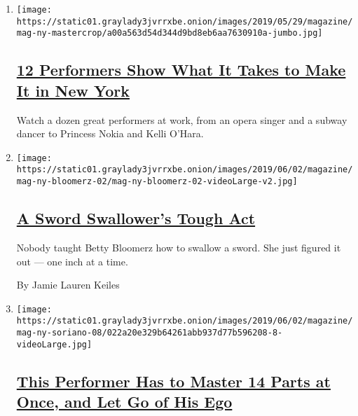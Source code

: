 \begin{enumerate}
\def\labelenumi{\arabic{enumi}.}
\item
  \texttt{[image: https://static01.graylady3jvrrxbe.onion/images/2019/05/29/magazine/mag-ny-mastercrop/a00a563d54d344d9bd8eb6aa7630910a-jumbo.jpg]}

  \hypertarget{12-performers-show-what-it-takes-to-make-it-in-new-york}{%
  \subsection{\texorpdfstring{\href{/interactive/2019/05/30/magazine/performers-new-york.html}{12
  Performers Show What It Takes to Make It in New
  York}}{12 Performers Show What It Takes to Make It in New York}}\label{12-performers-show-what-it-takes-to-make-it-in-new-york}}

  Watch a dozen great performers at work, from an opera singer and a
  subway dancer to Princess Nokia and Kelli O'Hara.
\item
  \texttt{[image: https://static01.graylady3jvrrxbe.onion/images/2019/06/02/magazine/mag-ny-bloomerz-02/mag-ny-bloomerz-02-videoLarge-v2.jpg]}

  \hypertarget{a-sword-swallowers-tough-act}{%
  \subsection{\texorpdfstring{\href{/interactive/2019/05/30/magazine/sword-swallowing-new-york.html}{A
  Sword Swallower's Tough
  Act}}{A Sword Swallower's Tough Act}}\label{a-sword-swallowers-tough-act}}

  Nobody taught Betty Bloomerz how to swallow a sword. She just figured
  it out --- one inch at a time.

  By Jamie Lauren Keiles
\item
  \texttt{[image: https://static01.graylady3jvrrxbe.onion/images/2019/06/02/magazine/mag-ny-soriano-08/022a20e329b64261abb937d77b596208-8-videoLarge.jpg]}

  \hypertarget{this-performer-has-to-master-14-parts-at-once-and-let-go-of-his-ego}{%
  \subsection{\texorpdfstring{\href{/interactive/2019/05/30/magazine/aladdin-musical-new-york.html}{This
  Performer Has to Master 14 Parts at Once, and Let Go of His
  Ego}}{This Performer Has to Master 14 Parts at Once, and Let Go of His Ego}}\label{this-performer-has-to-master-14-parts-at-once-and-let-go-of-his-ego}}


\end{enumerate}
